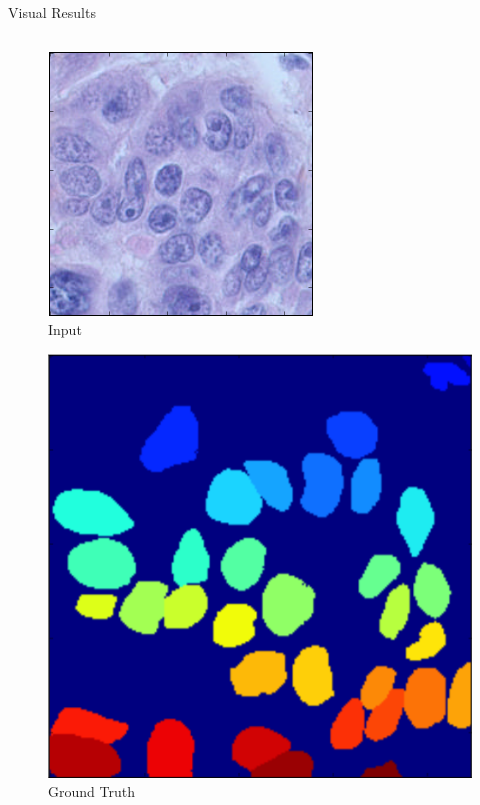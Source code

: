 \documentclass{beamer}
\begin{document}
\begin{frame}{Visual Results}

\begin{columns}
\begin{column}{0.3\textwidth}
\begin{figure}
\includegraphics[width = 0.8\linewidth]{RGB_pred} 
\caption{Input}
\end{figure}

\begin{figure}
\includegraphics[width = 0.8\linewidth]{GT_pred} 
\caption{Ground Truth}
\end{figure}


\end{column}
\end{columns}
\end{frame}
\end{document}
